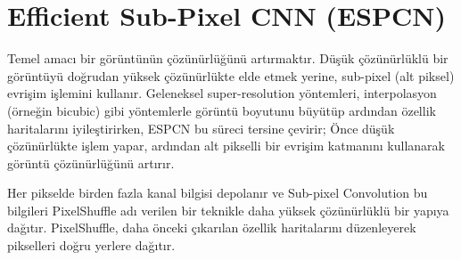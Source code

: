 \section{Efficient Sub-Pixel CNN (ESPCN)}

Temel amacı bir görüntünün çözünürlüğünü artırmaktır. Düşük çözünürlüklü bir görüntüyü doğrudan yüksek çözünürlükte elde etmek yerine, sub-pixel (alt piksel) evrişim işlemini kullanır. Geleneksel super-resolution yöntemleri, interpolasyon (örneğin bicubic) gibi yöntemlerle görüntü boyutunu büyütüp ardından özellik haritalarını iyileştirirken, ESPCN bu süreci tersine çevirir; Önce düşük çözünürlükte işlem yapar, ardından alt pikselli bir evrişim katmanını kullanarak görüntü çözünürlüğünü artırır.

Her pikselde birden fazla kanal bilgisi depolanır ve Sub-pixel Convolution bu bilgileri PixelShuffle adı verilen bir teknikle daha yüksek çözünürlüklü bir yapıya dağıtır. PixelShuffle, daha önceki çıkarılan özellik haritalarını düzenleyerek pikselleri doğru yerlere dağıtır. 

\newpage